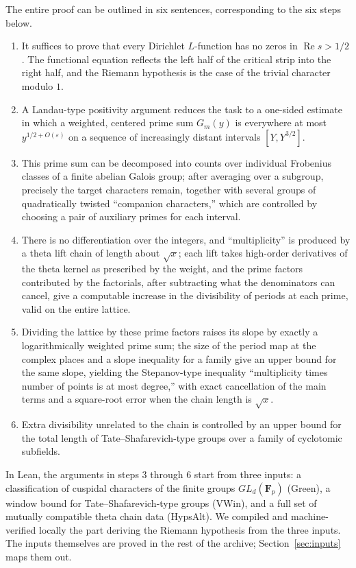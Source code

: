 \documentclass[11pt]{article}
\renewcommand{\Re}{\operatorname{Re}}
\begin{document}
The entire proof can be outlined in six sentences, corresponding to the six steps below.
\begin{enumerate}
\item It suffices to prove that every Dirichlet $L$-function has no zeros in $\Re s>1/2$. The functional equation reflects the left half of the critical strip into the right half, and the Riemann hypothesis is the case of the trivial character modulo $1$.
\item A Landau-type positivity argument reduces the task to a one-sided estimate in which a weighted, centered prime sum $G_m(y)$ is everywhere at most $y^{1/2+O(\varepsilon)}$ on a sequence of increasingly distant intervals $[Y,Y^{3/2}]$.
\item This prime sum can be decomposed into counts over individual Frobenius classes of a finite abelian Galois group; after averaging over a subgroup, precisely the target characters remain, together with several groups of quadratically twisted ``companion characters,'' which are controlled by choosing a pair of auxiliary primes for each interval.
\item There is no differentiation over the integers, and ``multiplicity'' is produced by a theta lift chain of length about $\sqrt x$; each lift takes high-order derivatives of the theta kernel as prescribed by the weight, and the prime factors contributed by the factorials, after subtracting what the denominators can cancel, give a computable increase in the divisibility of periods at each prime, valid on the entire lattice.
\item Dividing the lattice by these prime factors raises its slope by exactly a logarithmically weighted prime sum; the size of the period map at the complex places and a slope inequality for a family give an upper bound for the same slope, yielding the Stepanov-type inequality ``multiplicity times number of points is at most degree,'' with exact cancellation of the main terms and a square-root error when the chain length is $\sqrt x$.
\item Extra divisibility unrelated to the chain is controlled by an upper bound for the total length of Tate--Shafarevich-type groups over a family of cyclotomic subfields.
\end{enumerate}

In Lean, the arguments in steps 3 through 6 start from three inputs: a classification of cuspidal characters of the finite groups $GL_d(\mathbf F_p)$ (\textsf{Green}), a window bound for Tate--Shafarevich-type groups (\textsf{VWin}), and a full set of mutually compatible theta chain data (\textsf{HypsAlt}). We compiled and machine-verified locally the part deriving the Riemann hypothesis from the three inputs. The inputs themselves are proved in the rest of the archive; Section~\ref{sec:inputs} maps them out.
\end{document}
